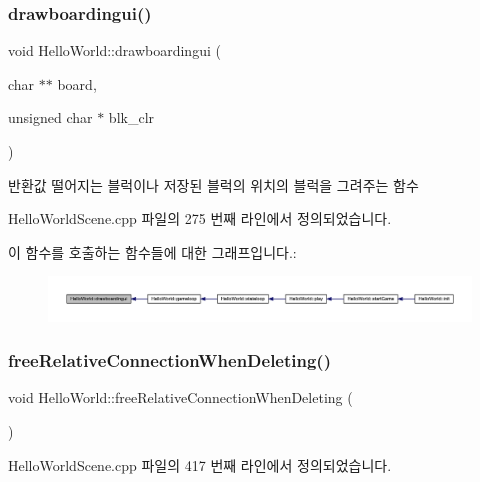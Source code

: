\subsubsection{\texorpdfstring{drawboardingui()}{drawboardingui()}}
{\footnotesize\ttfamily void Hello\+World\+::drawboardingui (\begin{DoxyParamCaption}\item[{char $\ast$$\ast$}]{board,  }\item[{unsigned char $\ast$}]{blk\+\_\+clr }\end{DoxyParamCaption})}

\begin{DoxyReturn}{반환값}
떨어지는 블럭이나 저장된 블럭의 위치의 블럭을 그려주는 함수 
\end{DoxyReturn}


Hello\+World\+Scene.\+cpp 파일의 275 번째 라인에서 정의되었습니다.

이 함수를 호출하는 함수들에 대한 그래프입니다.\+:
\nopagebreak
\begin{figure}[H]
\begin{center}
\leavevmode
\includegraphics[width=350pt]{class_hello_world_a0456ce3ab8880643c5e8739634156d93_icgraph}
\end{center}
\end{figure}
\mbox{\label{class_hello_world_ab2e9dbd1b003e6d26a10a76495efcc2a}} 
\subsubsection{\texorpdfstring{free\+Relative\+Connection\+When\+Deleting()}{freeRelativeConnectionWhenDeleting()}}
{\footnotesize\ttfamily void Hello\+World\+::free\+Relative\+Connection\+When\+Deleting (\begin{DoxyParamCaption}{ }\end{DoxyParamCaption})\hspace{0.3cm}{\ttfamily [protected]}}



Hello\+World\+Scene.\+cpp 파일의 417 번째 라인에서 정의되었습니다.

